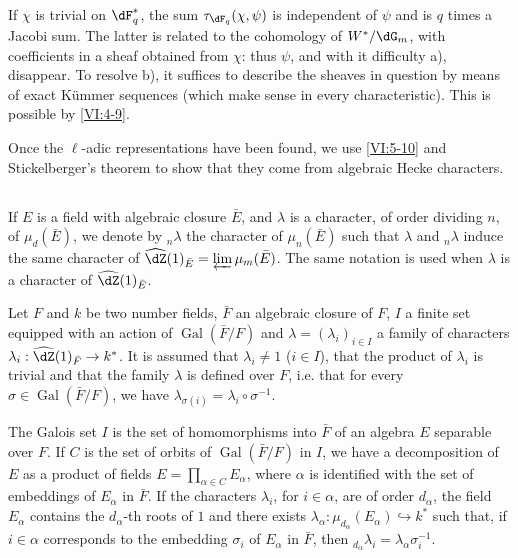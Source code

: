 \documentclass[oneside]{book}
\DeclareMathOperator{\gal}{Gal}
\newcounter{char}
\theoremstyle{sga-source}
\theoremstyle{sga-source-dash}
\theoremstyle{sga-source-dotdash}
\theoremstyle{sga-source-number-note-dash}
\theoremstyle{sga-source-note-number-dotdash}
\theoremstyle{sga-source-example-dotdash}
\theoremstyle{sga-source-inline-number}
\theoremstyle{sga-source-bare-number}
\theoremstyle{sga-source}
\newcommand{\PrintPage}[1]{}\newcommand{\MathPage}[1]{}\newcommand{\PrintCite}[2]{#1}\newcommand{\var}[3]{#1}
\begin{document}
If $\chi$ is trivial on $\dF_q^\ast$, the sum $\tau_{\dF_q}(\chi,\psi)$ 
is independent of $\psi$ and is $q$ times a Jacobi sum. The latter is 
related to the cohomology of $W^\ast/\dG_m$, with coefficients in a sheaf 
obtained from $\chi$: thus $\psi$, and with it difficulty a), disappear. To 
resolve b), it suffices to describe the sheaves in question by means of 
exact \var{K\"ummer}{Kummer}{S45-SOL-0889} sequences (which make sense in every characteristic). This is 
possible by \ref{VI:4-9}. 

Once the $\ell$-adic representations have been found, we use 
\ref{VI:5-10} and Stickelberger's theorem to show that they 
come from algebraic Hecke characters. 





\subsection{}\label{VI:6-1}

If $E$ is a field with algebraic closure $\bar E$, and $\lambda$ is 
a character, of order dividing $n$, of $\mu_d(\bar E)$, we denote by $_n\lambda$ the 
character of $\mu_n(\bar E)$ such that $\lambda$ and $_n \lambda$ induce the 
same character of $\widehat\dZ(1)_{\bar E} = \varprojlim \mu_m(\bar E)$. The 
same notation is used when $\lambda$ is a character of $\widehat\dZ(1)_{\bar E}$.

Let $F$ and $k$ be two number fields, $\bar F$ an algebraic closure of 
$F$, $I$ a finite set equipped with an action of $\gal(\bar F/F)$ and 
$\lambda=(\lambda_i)_{i\in I}$ a family of characters 
$\lambda_i:\widehat\dZ(1)_{\bar F} \to k^\ast$. It is assumed that 
$\lambda_i\ne 1$ ($i\in I$), that \PrintPage{214}
the product of $\lambda_i$ is trivial and that 
the family $\lambda$ is defined over $F$, i.e. that for every 
$\sigma\in \gal(\bar F/F)$, we have 
$\lambda_{\sigma(i)}=\lambda_i\circ \sigma^{-1}$. 

The Galois set $I$ is the set of homomorphisms into $\bar F$ of an 
algebra $E$ separable over $F$. If $C$ is the set of orbits of 
$\gal(\bar F/F)$ in $I$, we have a decomposition of $E$ as a product of fields 
$E=\prod_{\alpha\in C} E_\alpha$, where $\alpha$ is identified with the set of 
embeddings of $E_\alpha$ in $\bar F$. If the characters $\lambda_i$, for 
$i\in \alpha$, are of order $d_\alpha$, the field $E_\alpha$ contains the 
$d_\alpha$-th roots of $1$ and there exists 
$\lambda_\alpha:\mu_{d_\alpha}(E_\alpha) \hookrightarrow k^\ast$ such that, if 
$i\in \alpha$ corresponds to the embedding $\sigma_i$ of $E_\alpha$ in $\bar F$, 
then $_{d_\alpha} \lambda_i = \lambda_\alpha \sigma_i^{-1}$. 
\end{document}
